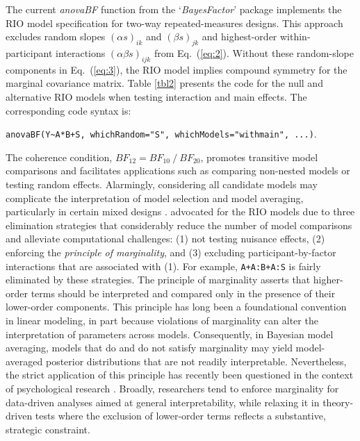 \documentclass[preprint,12pt,authoryear]{elsarticle}
\begin{document}
The current \textit{anovaBF} function from the `\textit{BayesFactor}' package implements the RIO model specification for two-way repeated-measures designs. This approach excludes random slopes $(\alpha s)_{ik}$ and $(\beta s)_{jk}$ and highest-order within-participant interactions $(\alpha\beta s)_{ijk}$ from Eq.~(\ref{eq:2}). Without these random-slope components in Eq.~(\ref{eq:3}), the RIO model implies compound symmetry for the marginal covariance matrix. Table \ref{tbl2} presents the code for the null and alternative RIO models when testing interaction and main effects. The corresponding code syntax is:
\begin{center}
	\texttt{anovaBF(Y\textasciitilde A*B+S, whichRandom="S", whichModels="withmain", ...)}.
\end{center}
The coherence condition, $\mathit{BF}_{12}=\mathit{BF}_{10}\ \!/\ \!\mathit{BF}_{20}$, promotes transitive model comparisons and facilitates applications such as comparing non-nested models or testing random effects. Alarmingly, considering all candidate models may complicate the interpretation of model selection and model averaging, particularly in certain mixed designs \citep{van_doorn_bayes_2023}. \citet[p.~314]{rouder_bayesian_2017} advocated for the RIO models due to three elimination strategies that considerably reduce the number of model comparisons and alleviate computational challenges: (1) not testing nuisance effects, (2) enforcing the \textit{principle of marginality}, and (3) excluding participant-by-factor interactions that are associated with (1). For example, \texttt{A+A:B+A:S} is fairly eliminated by these strategies. The principle of marginality asserts that higher-order terms should be interpreted and compared only in the presence of their lower-order components. This principle has long been a foundational convention in linear modeling, in part because violations of marginality can alter the interpretation of parameters across models. Consequently, in Bayesian model averaging, models that do and do not satisfy marginality may yield model-averaged posterior distributions that are not readily interpretable. Nevertheless, the strict application of this principle has recently been questioned in the context of psychological research \citetext{%
	\citealp{heathcote_limits_2023}; %
	\citealp{van_doorn_bayes_2023-2}; %
	type II sum of squares in \citealp[pp.~8–9]{van_den_bergh_bayesian_2023}}.
Broadly, researchers tend to enforce marginality for data-driven analyses aimed at general interpretability, while relaxing it in theory-driven tests where the exclusion of lower-order terms reflects a substantive, strategic constraint.
\end{document}
